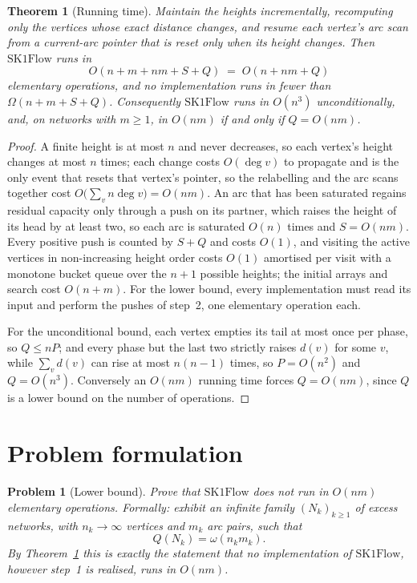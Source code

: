 \documentclass[10pt]{article}
\newtheorem{problem}{Problem}
\newtheorem{theorem}{Theorem}
\newcommand{\SKF}{\text{SK1Flow}}
\begin{document}
\begin{theorem}[Running time]\label{thm:time}
Maintain the heights incrementally, recomputing only the vertices whose exact
distance changes, and resume each vertex's arc scan from a current-arc pointer
that is reset only when its height changes. Then $\SKF$ runs in
\[
  O(n+m+nm+S+Q)\;=\;O(n+nm+Q)
\]
elementary operations, and no implementation runs in fewer than
$\Omega(n+m+S+Q)$. Consequently $\SKF$ runs in $O(n^{3})$ unconditionally, and,
on networks with $m\ge1$, in $O(nm)$ if and only if $Q=O(nm)$.
\end{theorem}

\begin{proof}
A finite height is at most $n$ and never decreases, so each vertex's height
changes at most $n$ times; each change costs $O(\deg v)$ to propagate and is the
only event that resets that vertex's pointer, so the relabelling and the arc
scans together cost $O\bigl(\sum_v n\deg v\bigr)=O(nm)$. An arc that has been
saturated regains residual capacity only through a push on its partner, which
raises the height of its head by at least two, so each arc is saturated $O(n)$
times and $S=O(nm)$. Every positive push is counted by $S+Q$ and costs $O(1)$,
and visiting the active vertices in non-increasing height order costs $O(1)$
amortised per visit with a monotone bucket queue over the $n+1$ possible
heights; the initial arrays and search cost $O(n+m)$. For the lower bound, every
implementation must read its input and perform the pushes of step~2, one
elementary operation each.

For the unconditional bound, each vertex empties its tail at most once per phase,
so $Q\le nP$; and every phase but the last two strictly raises $d(v)$ for some
$v$, while $\sum_v d(v)$ can rise at most $n(n-1)$ times, so $P=O(n^{2})$ and
$Q=O(n^{3})$. Conversely an $O(nm)$ running time forces $Q=O(nm)$, since $Q$ is
a lower bound on the number of operations.
\end{proof}

\section{Problem formulation}

\begin{problem}[Lower bound]\label{prob:lower}
Prove that $\SKF$ does not run in $O(nm)$ elementary operations. Formally:
exhibit an infinite family $(N_k)_{k\ge1}$ of excess networks, with $n_k\to\infty$
vertices and $m_k$ arc pairs, such that
\[
  Q(N_k)=\omega(n_km_k).
\]
By Theorem~\ref{thm:time} this is exactly the statement that no
implementation of $\SKF$, however step~1 is realised, runs in $O(nm)$.
\end{problem}
\end{document}
